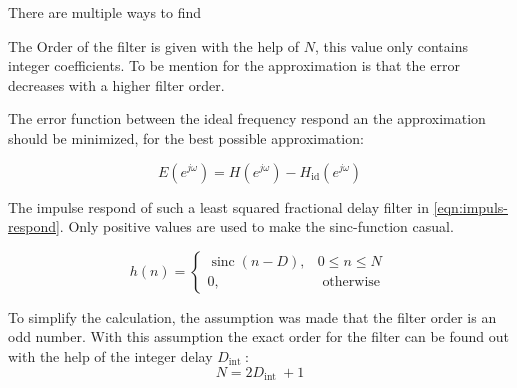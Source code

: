 
There are multiple ways to find 




The Order of the filter is given with the help of \(N\), this value only contains integer coefficients.
To be mention for the approximation is that the error decreases with a higher filter order.


The error function between the ideal frequency respond an the approximation should be minimized, for the best possible approximation:
  
\begin{equation} \label{eqn:error-function}
		E\left(e^{j \omega}\right)=H\left(e^{j \omega}\right)-H_{\mathrm{id}}\left(e^{j \omega}\right)
\end{equation}

The impulse respond of such a least squared fractional delay filter in \eqref{eqn:impuls-respond}. Only positive values are used to make the sinc-function casual. 

\begin{equation} \label{eqn:impuls-respond}
	h(n)= \begin{cases}\operatorname{sinc}(n-D), & 0 \leq n \leq N \\ 0, & \text { otherwise }\end{cases}
\end{equation}

To simplify the calculation, the assumption was made that the filter order is an odd number. With this assumption the exact order for the filter can be found out with the help of the integer delay \(D_{\text {int }}\):
\begin{equation} \label{eqn:filter-order}
	N = 2 D_{\text {int }} + 1
\end{equation}


